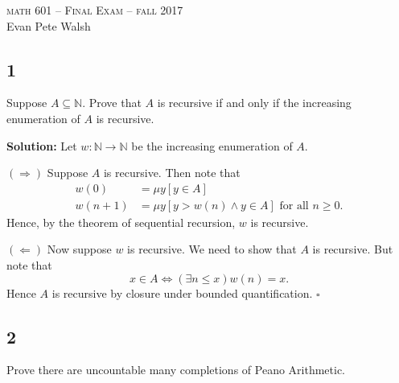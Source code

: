 \documentclass[12pt]{article}
\newcounter{ProofCounter}
\newenvironment{Solution}{\stepcounter{ProofCounter}\textbf{Solution:}}{\hfill$\square$}
\begin{document}
\thispagestyle{empty}
\begin{center}
  \Large \textsc{math 601 -- Final Exam -- fall 2017} \\ 
  \vspace{5mm}
  \large Evan Pete Walsh
\end{center}

\subsection*{1}
\begin{tcolorbox}
  Suppose $A \subseteq \mathbb{N}$. Prove that $A$ is recursive if and only if the increasing enumeration of $A$ is recursive.
\end{tcolorbox}

\begin{Solution}
  Let $w : \mathbb{N} \rightarrow \mathbb{N}$ be the increasing enumeration of $A$.

  $(\Rightarrow)$ Suppose $A$ is recursive. Then note that 
  \begin{align*}
    w(0) & = \mu y [ y \in A ] \\
    w(n + 1) & = \mu y [ y > w(n) \wedge y \in A ] \text{ for all } n \geq 0.
  \end{align*}
  Hence, by the theorem of sequential recursion, $w$ is recursive.

  $(\Leftarrow)$ Now suppose $w$ is recursive. We need to show that $A$ is recursive. But note that 
  \[ x \in A \Leftrightarrow (\exists n \leq x) w(n) = x. \]
  Hence $A$ is recursive by closure under bounded quantification.
\end{Solution}


\newpage
\subsection*{2}
\begin{tcolorbox}
  Prove there are uncountable many completions of Peano Arithmetic.
\end{tcolorbox}
\end{document}
